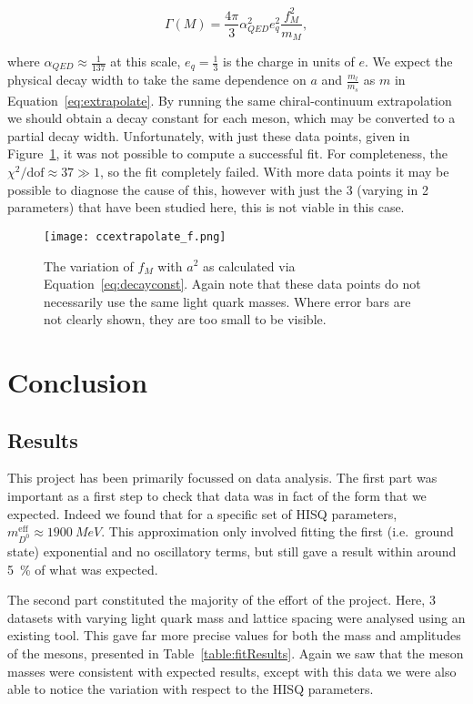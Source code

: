 \documentclass[a4paper,12pt]{article}
\begin{document}
\begin{equation}
    \Gamma(M) = \frac{4\pi}{3}\alpha_{QED}^2e_q^2 \frac{f_M^2}{m_M},
\end{equation}

where $\alpha_{QED}\approx \frac{1}{137}$ at this scale, $e_q=\frac{1}{3}$ is the charge in units of $e$. We expect the physical decay width to take the same dependence on $a$ and $\frac{m_l}{m_s}$ as $m$ in Equation~\ref{eq:extrapolate}. By running the same chiral-continuum extrapolation we should obtain a decay constant for each meson, which may be converted to a partial decay width. Unfortunately, with just these data points, given in Figure~\ref{fig:extrapolate_f}, it was not possible to compute a successful fit. For completeness, the $\chi^2 / \mathrm{dof} \approx 37 \gg 1$, so the fit completely failed. With more data points it may be possible to diagnose the cause of this, however with just the 3 (varying in 2 parameters) that have been studied here, this is not viable in this case.

\begin{figure}
    \centering
    \texttt{[image: ccextrapolate\_f.png]}
    \caption{The variation of $f_M$ with $a^2$ as calculated via Equation~\ref{eq:decayconst}. Again note that these data points do not necessarily use the same light quark masses. Where error bars are not clearly shown, they are too small to be visible.\label{fig:extrapolate_f}}
\end{figure}

\section{Conclusion}
\subsection{Results}
This project has been primarily focussed on data analysis. The first part was important as a first step to check that data was in fact of the form that we expected. Indeed we found that for a specific set of HISQ parameters, $m^\mathrm{eff}_{D^0}\approx \SI{1900}{MeV}$. This approximation only involved fitting the first (i.e.\ ground state) exponential and no oscillatory terms, but still gave a result within around \SI{5}{\%} of what was expected.

The second part constituted the majority of the effort of the project. Here, 3 datasets with varying light quark mass and lattice spacing were analysed using an existing tool. This gave far more precise values for both the mass and amplitudes of the mesons, presented in Table~\ref{table:fitResults}. Again we saw that the meson masses were consistent with expected results, except with this data we were also able to notice the variation with respect to the HISQ parameters.
\end{document}
